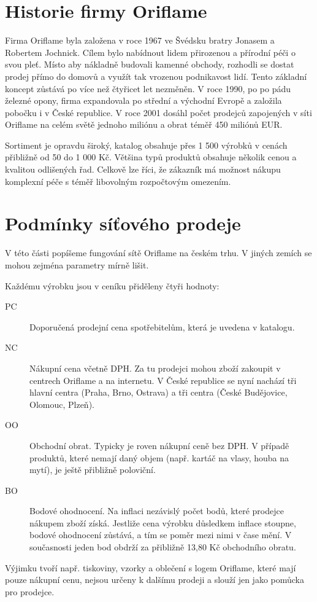 \documentclass[a4wide,12pt]{report}
\begin{document}
\section{Historie firmy Oriflame}
Firma Oriflame byla založena v roce 1967 ve Švédsku bratry Jonasem a Robertem Jochnick. Cílem bylo nabídnout lidem přirozenou a přírodní péči o svou pleť. Místo aby nákladně budovali kamenné obchody, rozhodli se dostat prodej přímo do domovů a využít tak vrozenou podnikavost lidí. Tento základní koncept zůstává po více než čtyřicet let nezměněn. V roce 1990, po po pádu železné opony, firma expandovala po střední a východní Evropě a založila pobočku i v České republice. V roce 2001 dosáhl počet prodejců zapojených v síti Oriflame na celém světě jednoho miliónu a obrat téměř 450 miliónů EUR.

Sortiment je opravdu široký, katalog obsahuje přes 1 500 výrobků v cenách přibližně od 50 do 1 000 Kč. Většina typů produktů obsahuje několik cenou a kvalitou odlišených řad. Celkově lze říci, že zákazník má možnost nákupu komplexní péče s téměř libovolným rozpočtovým omezením.
\section{Podmínky síťového prodeje}
V této části popíšeme fungování sítě Oriflame na českém trhu. V jiných zemích se mohou zejména parametry mírně lišit.

Každému výrobku jsou v ceníku přiděleny čtyři hodnoty:
\begin{description}
\item[PC] Doporučená prodejní cena spotřebitelům, která je uvedena v katalogu.
\item[NC] Nákupní cena včetně DPH. Za tu prodejci mohou zboží zakoupit v centrech Oriflame a na internetu. V České republice se nyní nachází tři hlavní centra (Praha, Brno, Ostrava) a tři centra (České Budějovice, Olomouc, Plzeň).
\item[OO] Obchodní obrat. Typicky je roven nákupní ceně bez DPH. V případě produktů, které nemají daný objem (např. kartáč na vlasy, houba na mytí), je ještě přibližně poloviční.
\item[BO] Bodové ohodnocení. Na inflaci nezávislý počet bodů, které prodejce nákupem zboží získá. Jestliže cena výrobku důsledkem inflace stoupne, bodové ohodnocení zůstává, a tím se poměr mezi nimi v čase mění. V současnosti jeden bod obdrží za přibližně 13,80 Kč obchodního obratu.
\end{description}
Výjimku tvoří např. tiskoviny, vzorky a oblečení s logem Oriflame, které mají pouze nákupní cenu,  nejsou určeny k dalšímu prodeji a slouží jen jako pomůcka pro prodejce.
\end{document}
